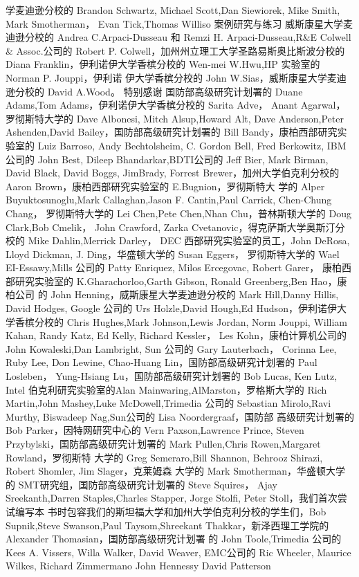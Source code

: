 学麦迪逊分校的 Brandon Schwartz, Michael Scott,Dan Siewiorek, Mike Smith, Mark Smotherman，
Evan Tick,Thomas Williso
案例研究与练习
威斯康星大学麦迪逊分校的 Andrea C.Arpaci-Dusseau 和 Remzi H. Arpaci-Dusseau,R&E
Colwell & Assoc.公司的 Robert P. Colwell，加州州立理工大学圣路易斯奥比斯波分校的 Diana
Franklin，伊利诺伊大学香槟分校的 Wen-mei W.Hwu,HP 实验室的 Norman P. Jouppi，伊利诺
伊大学香槟分校的 John W.Sias，威斯康星大学麦迪逊分校的 David A.Wood。
特别感谢
国防部高级研究计划署的 Duane Adams,Tom Adams，伊利诺伊大学香槟分校的 Sarita Adve，
Anant Agarwal，罗彻斯特大学的 Dave Albonesi, Mitch Alsup,Howard Alt, Dave Anderson,Peter
Ashenden,David Bailey，国防部高级研究计划署的 Bill Bandy，康柏西部研究实验室的 Luiz
Barroso, Andy Bechtolsheim, C. Gordon Bell, Fred Berkowitz, IBM公司的 John Best, Dileep
Bhandarkar,BDTI公司的 Jeff Bier, Mark Birman, David Black, David Boggs, JimBrady, Forrest
Brewer，加州大学伯克利分校的 Aaron Brown，康柏西部研究实验室的 E.Bugnion，罗彻斯特大
学的 Alper Buyuktosunoglu,Mark Callaghan,Jason F. Cantin,Paul Carrick, Chen-Chung Chang，
罗彻斯特大学的 Lei Chen,Pete Chen,Nhan Chu，普林斯顿大学的 Doug Clark,Bob Cmelik，
John Crawford, Zarka Cvetanovic，得克萨斯大学奥斯汀分校的 Mike Dahlin,Merrick Darley，
DEC 西部研究实验室的员工，John DeRosa, Lloyd Dickman, J. Ding，华盛顿大学的 Susan Eggers，
罗彻斯特大学的 Wael EI-Essawy,Mills 公司的 Patty Enriquez, Milos Ercegovac, Robert Garer，
康柏西部研究实验室的 K.Gharachorloo,Garth Gibson, Ronald Greenberg,Ben Hao，康柏公司
的 John Henning，威斯康星大学麦迪逊分校的 Mark Hill,Danny Hillis, David Hodges, Google
公司的 Urs Holzle,David Hough,Ed Hudson，伊利诺伊大学香槟分校的 Chris Hughes,Mark
Johnson,Lewis Jordan, Norm Jouppi, William Kahan, Randy Katz, Ed Kelly, Richard Kessler，
Les Kohn，康柏计算机公司的 John Kowaleski,Dan Lambright, Sun 公司的 Gary Lauterbach，
Corinna Lee, Ruby Lee, Don Lewine, Chao-Huang Lin，国防部高级研究计划署的 Paul Losleben，
Yung-Hsiang Lu，国防部高级研究计划署的 Bob Lucas, Ken Lutz, Intel 伯克利研究实验室的Alan
Mainwaring,AlMarston，罗格斯大学的 Rich Martin,John Mashey,Luke McDowell,Trimedia
公司的 Sebastian Mirolo,Ravi Murthy, Biswadeep Nag,Sun公司的 Lisa Noordergraaf，国防部
高级研究计划署的 Bob Parker，因特网研究中心的 Vern Paxson,Lawrence Prince, Steven
Przybylski，国防部高级研究计划署的 Mark Pullen,Chris Rowen,Margaret Rowland，罗彻斯特
大学的 Greg Semeraro,Bill Shannon, Behrooz Shirazi, Robert Shomler, Jim Slager，克莱姆森
大学的 Mark Smotherman，华盛顿大学的 SMT研究组，国防部高级研究计划署的 Steve Squires，
Ajay Sreekanth,Darren Staples,Charles Stapper, Jorge Stolfi, Peter Stoll，我们首次尝试编写本
书时包容我们的斯坦福大学和加州大学伯克利分校的学生们，Bob Supnik,Steve Swanson,Paul
Taysom,Shreekant Thakkar，新泽西理工学院的 Alexander Thomasian，国防部高级研究计划署
的 John Toole,Trimedia 公司的 Kees A. Vissers, Willa Walker, David Weaver, EMC公司的 Ric
Wheeler, Maurice Wilkes, Richard Zimmermano
John Hennessy
David Patterson